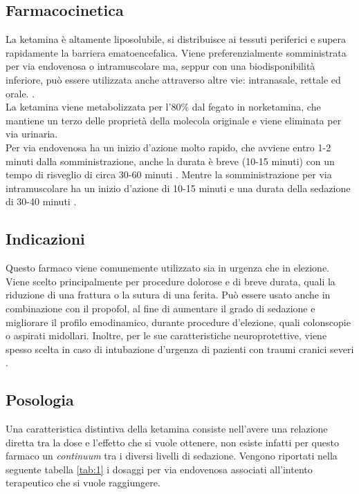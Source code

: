 \subsection*{Farmacocinetica}

La ketamina è altamente liposolubile, si distribuisce ai tessuti periferici e supera rapidamente la barriera ematoencefalica. Viene preferenzialmente somministrata per via endovenosa o intramuscolare ma, seppur con una biodisponibilità inferiore, può essere utilizzata anche attraverso altre vie: intranasale, rettale ed orale. \cite{Simeupsedazione, Ketamineapplication2019}. 
\\La ketamina viene metabolizzata per l'80\% dal fegato in norketamina, che mantiene un terzo delle proprietà della molecola originale e viene eliminata per via urinaria. 
\\Per via endovenosa ha un inizio d'azione molto rapido, che avviene entro 1-2 minuti dalla somministrazione, anche la durata è breve (10-15 minuti) con un tempo di risveglio di circa 30-60 minuti \cite{Uptodatepharmacology}. Mentre la somministrazione per via intramuscolare ha un inizio d'azione di 10-15 minuti e una durata della sedazione di 30-40 minuti \cite{Berkenbosch2015}.

\subsection*{Indicazioni}

Questo farmaco viene comunemente utilizzato sia in urgenza che in elezione. Viene scelto principalmente per procedure dolorose e di breve durata, quali la riduzione di una frattura o la sutura di una ferita. Può essere usato anche in combinazione con il propofol, al fine di aumentare il grado di sedazione e migliorare il profilo emodinamico, durante procedure d'elezione, quali colonscopie o aspirati midollari. Inoltre, per le sue caratteristiche neuroprotettive, viene spesso scelta in caso di intubazione d'urgenza di pazienti con traumi cranici severi \cite{Simeupsedazione}.

\subsection*{Posologia}

Una caratteristica distintiva della ketamina consiste nell'avere una relazione diretta tra la dose e l'effetto che si vuole ottenere, non esiste infatti per questo farmaco un \emph{continuum} tra i diversi livelli di sedazione. Vengono riportati nella seguente tabella \ref{tab:1} i dosaggi per via endovenosa associati all'intento terapeutico che si vuole raggiungere.


